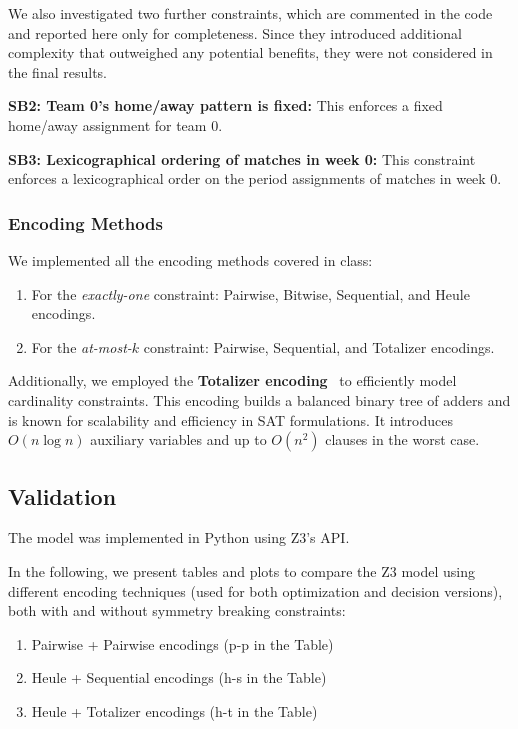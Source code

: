 We also investigated two further constraints, which are commented in the code and reported here only for completeness. Since they introduced additional complexity that outweighed any potential benefits, they were not considered in the final results.

\textbf{SB2: Team 0's home/away pattern is fixed:} This enforces a fixed home/away assignment for team 0.

\textbf{SB3: Lexicographical ordering of matches in week 0:} This constraint enforces a lexicographical order on the period assignments of matches in week 0.


\subsubsection*{Encoding Methods}
We implemented all the encoding methods covered in class:

\begin{enumerate}
    \item For the \textit{exactly-one} constraint: Pairwise, Bitwise, Sequential, and Heule encodings.
    \item For the \textit{at-most-$k$} constraint: Pairwise, Sequential, and Totalizer encodings.
\end{enumerate}

Additionally, we employed the \textbf{Totalizer encoding}~\cite{bailleux2003} to efficiently model cardinality constraints. This encoding builds a balanced binary tree of adders and is known for scalability and efficiency in SAT formulations. It introduces $O(n \log n)$ auxiliary variables and up to $O(n^2)$ clauses in the worst case.

\subsection{Validation}
\label{validation}
The model was implemented in Python using Z3's API. 


In the following, we present tables and plots to compare the Z3 model using different encoding techniques (used for both optimization and decision versions), both with and without symmetry breaking constraints:

\begin{enumerate}
\item Pairwise + Pairwise encodings  (p-p in the Table)
\item Heule + Sequential encodings   (h-s in the Table)
\item Heule + Totalizer encodings    (h-t in the Table)
\end{enumerate}


